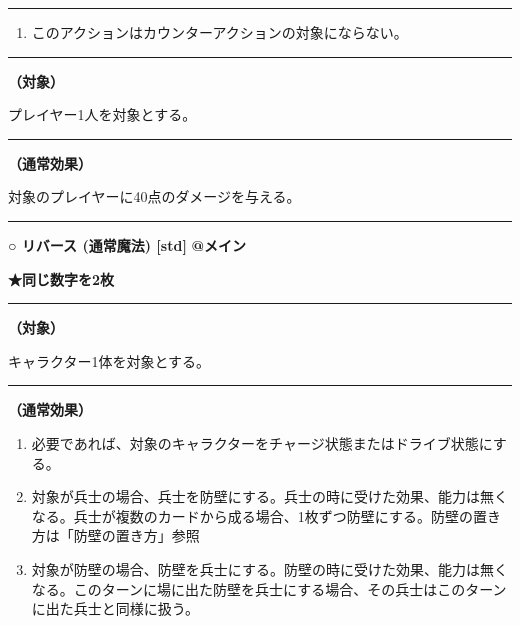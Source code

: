 \documentclass[twocolumn,a5paper,papersize,10pt]{jarticle}
\begin{document}
\vspace{1mm}%
\hrule height 0.1mm depth 0mm width 66.5mm %
\vspace{1mm}%


\vspace{-1zh}%
\begin{enumerate}
\renewcommand{\labelenumi}{※}
\setlength{\leftskip}{-0.3cm}
\setlength{\itemsep}{0pt} %
\setlength{\parskip}{0pt} %

\item このアクションはカウンターアクションの対象にならない。

\vspace{-3mm}%
\end{enumerate}
\vspace{1mm}%
\hrule height 0.1mm depth 0mm width 66.5mm %
\vspace{1mm}%
{\bf（対象）}

プレイヤー1人を対象とする。
\vspace{1mm}%
\hrule height 0.1mm depth 0mm width 66.5mm %
\vspace{1mm}%

{\bf（通常効果）}

対象のプレイヤーに40点のダメージを与える。
\vspace{2mm} %
\hrule height 0.5mm depth 0mm width 66.5mm %
\vspace{1mm} %
{\small\bf ○ リバース {\scriptsize (通常魔法) [std]}} %
\hfill 
{\footnotesize\bf @メイン }

{\footnotesize\bf ★同じ数字を2枚}

\vspace{1mm}%
\hrule height 0.1mm depth 0mm width 66.5mm %
\vspace{1mm}%
{\bf（対象）}

キャラクター1体を対象とする。
\vspace{1mm}%
\hrule height 0.1mm depth 0mm width 66.5mm %
\vspace{1mm}%

{\bf（通常効果）}


\vspace{-1zh}%
\begin{enumerate}
\setlength{\leftskip}{-0.3cm}
\setlength{\parskip}{0pt} %

\item 必要であれば、対象のキャラクターをチャージ状態またはドライブ状態にする。

\item 対象が兵士の場合、兵士を防壁にする。兵士の時に受けた効果、能力は無くなる。兵士が複数のカードから成る場合、1枚ずつ防壁にする。防壁の置き方は「防壁の置き方」参照

\item 対象が防壁の場合、防壁を兵士にする。防壁の時に受けた効果、能力は無くなる。このターンに場に出た防壁を兵士にする場合、その兵士はこのターンに出た兵士と同様に扱う。
\vspace{-1zh}%
\end{enumerate}
\end{document}
